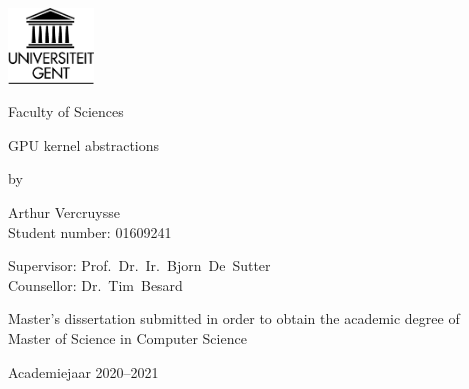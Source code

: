 

\begin{titlepage}

    \setlength{\hoffset}{-1in}
    \setlength{\voffset}{-1in}
    \setlength{\topmargin}{1.5cm}
    \setlength{\headheight}{0.5cm}
    \setlength{\headsep}{1cm}
    \setlength{\oddsidemargin}{3cm}
    \setlength{\evensidemargin}{3cm}
    \setlength{\footskip}{1.5cm}
    \enlargethispage{1cm}

    \fontsize{12pt}{14pt}
    \selectfont

    \begin{center}

    \includegraphics[height=2cm]{fig/ruglogo.png}

    \vspace{0.5cm}

    Faculty of Sciences\\

    \vspace{3.5cm}

    \fontsize{17.28pt}{21pt}
    \selectfont

    GPU kernel abstractions

    \fontsize{12pt}{14pt}
    \selectfont

    \vspace{.6cm}

    by

    \vspace{.4cm}

    Arthur Vercruysse\\
    Student number: 01609241

    \vspace{3.5cm}

    Supervisor: Prof.~Dr.~Ir.~Bjorn~De~Sutter\\
    Counsellor: Dr.~Tim~Besard\\

    \vspace{2cm}

    Master's dissertation submitted in order to obtain the academic degree of\\
    Master of Science in Computer Science

    \vspace{1cm}

    Academiejaar 2020--2021

    \end{center}
    \end{titlepage}

